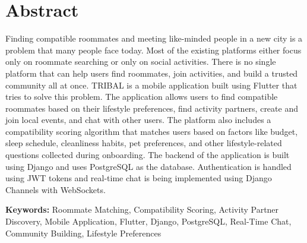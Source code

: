 \chapter*{Abstract}
Finding compatible roommates and meeting like-minded people in a new city is a problem that many people face today. Most of the existing platforms either focus only on roommate searching or only on social activities. There is no single platform that can help users find roommates, join activities, and build a trusted community all at once. TRIBAL is a mobile application built using Flutter that tries to solve this problem. The application allows users to find compatible roommates based on their lifestyle preferences, find activity partners, create and join local events, and chat with other users. The platform also includes a compatibility scoring algorithm that matches users based on factors like budget, sleep schedule, cleanliness habits, pet preferences, and other lifestyle-related questions collected during onboarding. The backend of the application is built using Django and uses PostgreSQL as the database. Authentication is handled using JWT tokens and real-time chat is being implemented using Django Channels with WebSockets.


\vspace{1em}
\noindent\textbf{Keywords:} Roommate Matching, Compatibility Scoring, Activity Partner Discovery, Mobile Application, Flutter, Django, PostgreSQL, Real-Time Chat, Community Building, Lifestyle Preferences


\clearpage